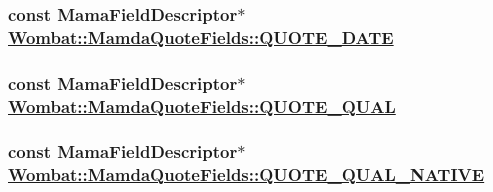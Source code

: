 \hypertarget{classWombat_1_1MamdaQuoteFields_ed0c8a8e450c6283d410e5d303b40db1}{
\subsubsection[QUOTE\_\-DATE]{\setlength{\rightskip}{0pt plus 5cm}const Mama\-Field\-Descriptor$\ast$ \hyperlink{classWombat_1_1MamdaQuoteFields_ed0c8a8e450c6283d410e5d303b40db1}{Wombat::Mamda\-Quote\-Fields::QUOTE\_\-DATE}}}
\label{classWombat_1_1MamdaQuoteFields_ed0c8a8e450c6283d410e5d303b40db1}


\hypertarget{classWombat_1_1MamdaQuoteFields_ec2ce6eaece7663786d99fe093b9e413}{
\subsubsection[QUOTE\_\-QUAL]{\setlength{\rightskip}{0pt plus 5cm}const Mama\-Field\-Descriptor$\ast$ \hyperlink{classWombat_1_1MamdaQuoteFields_ec2ce6eaece7663786d99fe093b9e413}{Wombat::Mamda\-Quote\-Fields::QUOTE\_\-QUAL}}}
\label{classWombat_1_1MamdaQuoteFields_ec2ce6eaece7663786d99fe093b9e413}


\hypertarget{classWombat_1_1MamdaQuoteFields_240035fe06f60d8cf7af26c229b848f0}{
\subsubsection[QUOTE\_\-QUAL\_\-NATIVE]{\setlength{\rightskip}{0pt plus 5cm}const Mama\-Field\-Descriptor$\ast$ \hyperlink{classWombat_1_1MamdaQuoteFields_240035fe06f60d8cf7af26c229b848f0}{Wombat::Mamda\-Quote\-Fields::QUOTE\_\-QUAL\_\-NATIVE}}}
\label{classWombat_1_1MamdaQuoteFields_240035fe06f60d8cf7af26c229b848f0}


